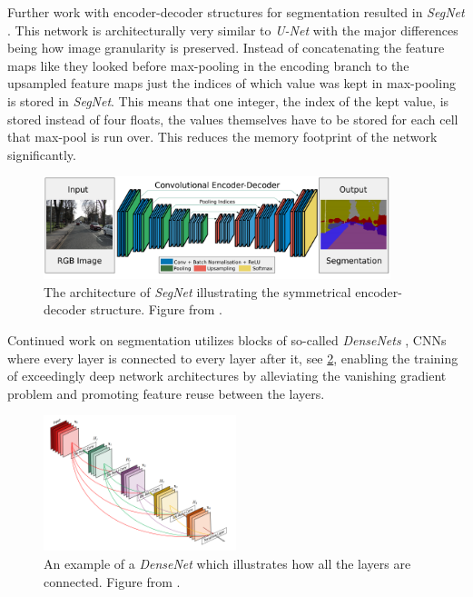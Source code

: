 \documentclass{kththesis}
\newcommand{\bibentry}[1]{\parencite{#1}}
\begin{document}
Further work with encoder-decoder structures for segmentation resulted in \emph{SegNet}
\bibentry{badrinarayanan2015segnet}. This network is architecturally very
similar to \textit{U-Net} with the major differences being how image
granularity is preserved. Instead of concatenating the feature maps like they
looked before max-pooling in the encoding branch to the upsampled feature maps
just the indices of which value was kept in max-pooling is stored in
\textit{SegNet}. This means that one integer, the index of the kept value, is
stored instead of four floats, the values themselves have to be stored for
each cell that max-pool is run over. This reduces the memory footprint of the
network significantly.

\begin{figure}[h]
  \centering
  \includegraphics[width=0.9\textwidth]{SegNet}
  \caption{The architecture of \textit{SegNet} illustrating the symmetrical
    encoder-decoder structure. Figure from \textcite[]{badrinarayanan2015segnet}.}
  \label{fig:SegNet}
  \end{figure}

Continued work on segmentation utilizes blocks of so-called \emph{DenseNets}
\bibentry{huang2017densely}, CNNs where every layer is connected to every layer
after it, see \cref{fig:DenseNet}, enabling the training of exceedingly deep network architectures by
alleviating the vanishing gradient problem and promoting feature reuse between
the layers.

\begin{figure}[h]
  \centering
  \includegraphics[width=0.5\textwidth]{dense}
  \caption{An example of a \textit{DenseNet} which illustrates how all the
    layers are connected. Figure from \textcite[]{huang2017densely}.}
  \label{fig:DenseNet}
  \end{figure}
\end{document}
